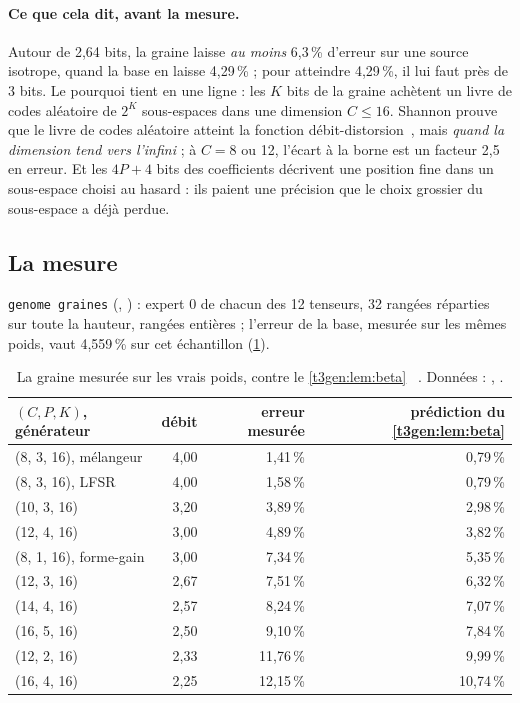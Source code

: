 \paragraph{Ce que cela dit, avant la mesure.} Autour de 2,64 bits, la graine laisse \emph{au moins} 6,3\,\% d'erreur sur une source isotrope, quand la base en laisse 4,29\,\% ; pour atteindre 4,29\,\%, il lui faut près de 3 bits. Le pourquoi tient en une ligne : les $K$ bits de la graine achètent un livre de codes aléatoire de $2^K$ sous-espaces dans une dimension $C \le 16$. Shannon prouve que le livre de codes aléatoire atteint la fonction débit-distorsion~\cite{shannon1959}, mais \emph{quand la dimension tend vers l'infini} ; à $C = 8$ ou 12, l'écart à la borne est un facteur 2,5 en erreur. Et les $4P + 4$ bits des coefficients décrivent une position fine dans un sous-espace choisi au hasard : ils paient une précision que le choix grossier du sous-espace a déjà perdue.

\subsection{La mesure}

\texttt{genome graines} (, ) : expert 0 de chacun des 12 tenseurs, 32 rangées réparties sur toute la hauteur, rangées entières ; l'erreur de la base, mesurée sur les mêmes poids, vaut 4,559\,\% sur cet échantillon (\cref{t3gen:tab:graine}).

\begin{table}[tbp]
\centering\small
\begin{tabular}{l r r r}
\toprule
$(C, P, K)$, générateur & débit & erreur mesurée & prédiction du \cref{t3gen:lem:beta} \\
\midrule
(8, 3, 16), mélangeur & 4,00 & 1,41\,\% & 0,79\,\% \\
(8, 3, 16), LFSR & 4,00 & 1,58\,\% & 0,79\,\% \\
(10, 3, 16) & 3,20 & 3,89\,\% & 2,98\,\% \\
(12, 4, 16) & 3,00 & 4,89\,\% & 3,82\,\% \\
(8, 1, 16), forme-gain & 3,00 & 7,34\,\% & 5,35\,\% \\
(12, 3, 16) & 2,67 & 7,51\,\% & 6,32\,\% \\
(14, 4, 16) & 2,57 & 8,24\,\% & 7,07\,\% \\
(16, 5, 16) & 2,50 & 9,10\,\% & 7,84\,\% \\
(12, 2, 16) & 2,33 & 11,76\,\% & 9,99\,\% \\
(16, 4, 16) & 2,25 & 12,15\,\% & 10,74\,\% \\
\bottomrule
\end{tabular}
\caption[La graine mesurée contre la théorie]{La graine mesurée sur les vrais poids, contre le \cref{t3gen:lem:beta} \mes~\calc. Données : , .}
\label{t3gen:tab:graine}
\end{table}

